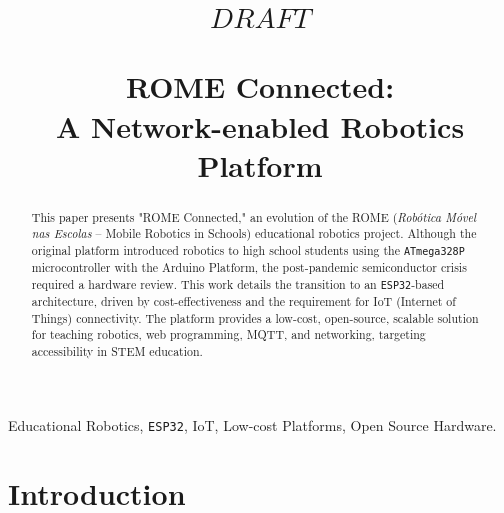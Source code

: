\documentclass[conference]{IEEEtran}
\begin{document}
\title{\[DRAFT\] \\ ROME Connected: \\ A Network-enabled Robotics Platform}

\author{
\and
}

\maketitle

\begin{abstract}
This paper presents "ROME Connected," an evolution of the ROME (\textit{Robótica Móvel nas Escolas} -- Mobile Robotics in Schools) educational robotics project. Although the original platform introduced robotics to high school students using the \texttt{ATmega328P} microcontroller with the Arduino Platform, the post-pandemic semiconductor crisis required a hardware review. This work details the transition to an \texttt{ESP32}-based architecture, driven by cost-effectiveness and the requirement for IoT (Internet of Things) connectivity. The platform provides a low-cost, open-source, scalable solution for teaching robotics, web programming, MQTT, and networking, targeting accessibility in STEM education.
\end{abstract}

\begin{IEEEkeywords}
Educational Robotics, \texttt{ESP32}, IoT, Low-cost Platforms, Open Source Hardware.
\end{IEEEkeywords}

\section{Introduction}
\end{document}

